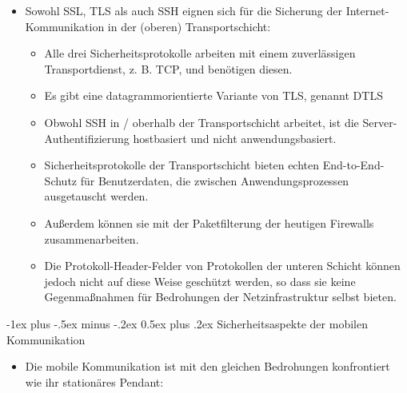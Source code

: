 \documentclass[a4paper]{article}
\makeatletter
\renewcommand{\section}{\@startsection{section}{1}{0mm}%
 {-1ex plus -.5ex minus -.2ex}%
 {0.5ex plus .2ex}%
 {\normalfont\large\bfseries}}
\makeatother
\begin{document}
\begin{multicols}{3}
    \begin{itemize}
        \item
              Sowohl SSL, TLS als auch SSH eignen sich für die Sicherung der
              Internet-Kommunikation in der (oberen) Transportschicht:

              \begin{itemize}
                  \item
                        Alle drei Sicherheitsprotokolle arbeiten mit einem zuverlässigen
                        Transportdienst, z. B. TCP, und benötigen diesen.
                  \item
                        Es gibt eine datagrammorientierte Variante von TLS, genannt DTLS
                  \item
                        Obwohl SSH in / oberhalb der Transportschicht arbeitet, ist die
                        Server-Authentifizierung hostbasiert und nicht anwendungsbasiert.
                  \item
                        Sicherheitsprotokolle der Transportschicht bieten echten
                        End-to-End-Schutz für Benutzerdaten, die zwischen
                        Anwendungsprozessen ausgetauscht werden.
                  \item
                        Außerdem können sie mit der Paketfilterung der heutigen Firewalls
                        zusammenarbeiten.
                  \item
                        Die Protokoll-Header-Felder von Protokollen der unteren Schicht
                        können jedoch nicht auf diese Weise geschützt werden, so dass sie
                        keine Gegenmaßnahmen für Bedrohungen der Netzinfrastruktur selbst
                        bieten.
              \end{itemize}
    \end{itemize}


    \section{Sicherheitsaspekte der mobilen
      Kommunikation}

    \begin{itemize}
        \item
              Die mobile Kommunikation ist mit den gleichen Bedrohungen konfrontiert
              wie ihr stationäres Pendant:


\end{itemize}
\end{multicols}
\end{document}
